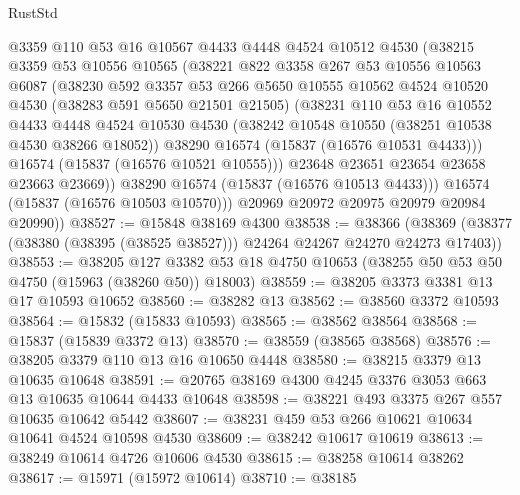 \begin{lexlean}{RustStd}
\begin{coremodule}
{\begin{coremodule}
{{{{{{{{{{{{{{{{{{{{{{{{{{{{{{{{{{{{{{{{{{{{{{{{{{{{{{{{{{{{            @3359
            @110
            @53
            @16
            @10567
            @4433
            @4448
            @4524
            @10512
            @4530
            (@38215
              @3359
              @53
              @10556
              @10565
              (@38221
                @822
                @3358
                @267
                @53
                @10556
                @10563
                @6087
                (@38230
                  @592
                  @3357
                  @53
                  @266
                  @5650
                  @10555
                  @10562
                  @4524
                  @10520
                  @4530
                  (@38283 @591 @5650 @21501 @21505)
                  (@38231
                    @110
                    @53
                    @16
                    @10552
                    @4433
                    @4448
                    @4524
                    @10530
                    @4530
                    (@38242 @10548 @10550 (@38251 @10538 @4530 @38266 @18052))
                    @38290
                    @16574
                    (@15837 (@16576 @10531 @4433)))
                  @16574
                  (@15837 (@16576 @10521 @10555)))
                @23648
                @23651
                @23654
                @23658
                @23663
                @23669))
            @38290
            @16574
            (@15837 (@16576 @10513 @4433)))
          @16574
          (@15837 (@16576 @10503 @10570)))
        @20969
        @20972
        @20975
        @20979
        @20984
        @20990))
@38527 := @15848 @38169 @4300
@38538 := @38366
    (@38369 (@38377 (@38380 (@38395 (@38525 @38527))) @24264 @24267 @24270 @24273 @17403))
@38553 := @38205
    @127
    @3382
    @53
    @18
    @4750
    @10653
    (@38255 @50 @53 @50 @4750 (@15963 (@38260 @50)) @18003)
@38559 := @38205 @3373 @3381 @13 @17 @10593 @10652
@38560 := @38282 @13
@38562 := @38560 @3372 @10593
@38564 := @15832 (@15833 @10593)
@38565 := @38562 @38564
@38568 := @15837 (@15839 @3372 @13)
@38570 := @38559 (@38565 @38568)
@38576 := @38205 @3379 @110 @13 @16 @10650 @4448
@38580 := @38215 @3379 @13 @10635 @10648
@38591 := @20765 @38169 @4300 @4245 @3376 @3053 @663 @13 @10635 @10644 @4433 @10648
@38598 := @38221 @493 @3375 @267 @557 @10635 @10642 @5442
@38607 := @38231 @459 @53 @266 @10621 @10634 @10641 @4524 @10598 @4530
@38609 := @38242 @10617 @10619
@38613 := @38249 @10614 @4726 @10606 @4530
@38615 := @38258 @10614 @38262
@38617 := @15971 (@15972 @10614)
@38710 := @38185
}}}}}}}}}}}}}}}}}}}}}}}}}}}}}}}}}}}}}}}}}}}}}}}}}}}}}}}}}}}}
\end{coremodule}}
\end{coremodule}
\end{lexlean}
